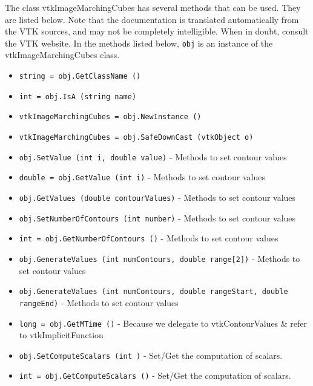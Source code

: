 The class vtkImageMarchingCubes has several methods that can be used.
  They are listed below.
Note that the documentation is translated automatically from the VTK sources,
and may not be completely intelligible.  When in doubt, consult the VTK website.
In the methods listed below, \verb|obj| is an instance of the vtkImageMarchingCubes class.
\begin{itemize}
\item  \verb|string = obj.GetClassName ()|

\item  \verb|int = obj.IsA (string name)|

\item  \verb|vtkImageMarchingCubes = obj.NewInstance ()|

\item  \verb|vtkImageMarchingCubes = obj.SafeDownCast (vtkObject o)|

\item  \verb|obj.SetValue (int i, double value)| -  Methods to set contour values

\item  \verb|double = obj.GetValue (int i)| -  Methods to set contour values

\item  \verb|obj.GetValues (double contourValues)| -  Methods to set contour values

\item  \verb|obj.SetNumberOfContours (int number)| -  Methods to set contour values

\item  \verb|int = obj.GetNumberOfContours ()| -  Methods to set contour values

\item  \verb|obj.GenerateValues (int numContours, double range[2])| -  Methods to set contour values

\item  \verb|obj.GenerateValues (int numContours, double rangeStart, double rangeEnd)| -  Methods to set contour values

\item  \verb|long = obj.GetMTime ()| -  Because we delegate to vtkContourValues \& refer to vtkImplicitFunction

\item  \verb|obj.SetComputeScalars (int )| -  Set/Get the computation of scalars.

\item  \verb|int = obj.GetComputeScalars ()| -  Set/Get the computation of scalars.


\end{itemize}
